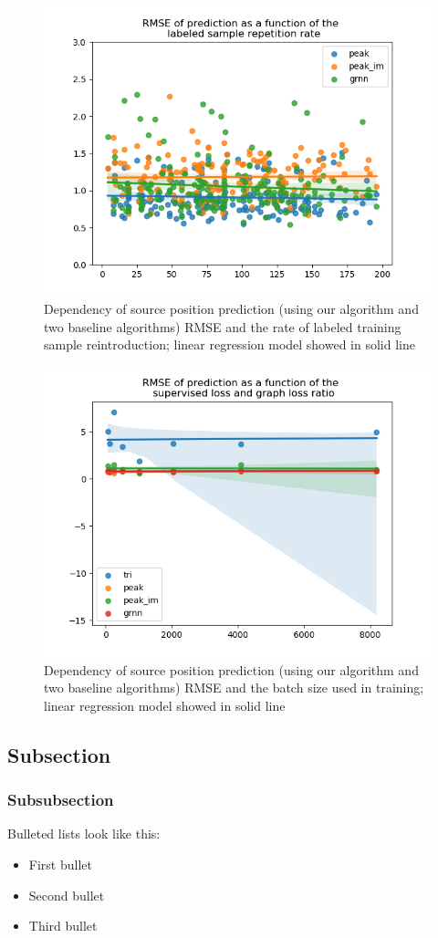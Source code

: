 \documentclass[applsci,article,submit,moreauthors,pdftex]{Definitions/mdpi}
\begin{document}
\begin{figure}[h!]
	\centering
	\includegraphics[width=0.4\linewidth]{img/RMSE_krep}
	\caption{Dependency of source position prediction (using our algorithm and two baseline algorithms) RMSE and the rate of labeled training sample reintroduction; linear regression model showed in solid line}
	\label{fig:rmsekrep}
\end{figure}

\begin{figure}[h!]
	\centering
	\includegraphics[width=0.4\linewidth]{img/rmse_batch_size}
	\caption{Dependency of source position prediction (using our algorithm and two baseline algorithms) RMSE and the batch size used in \grnn{} training; linear regression model showed in solid line}
	\label{fig:rmsebatchsize}
\end{figure}



\subsection{Subsection}
\unskip
\subsubsection{Subsubsection}

Bulleted lists look like this:
\begin{itemize}[leftmargin=*,labelsep=5.8mm]
\item	First bullet
\item	Second bullet
\item	Third bullet
\end{itemize}
\end{document}
